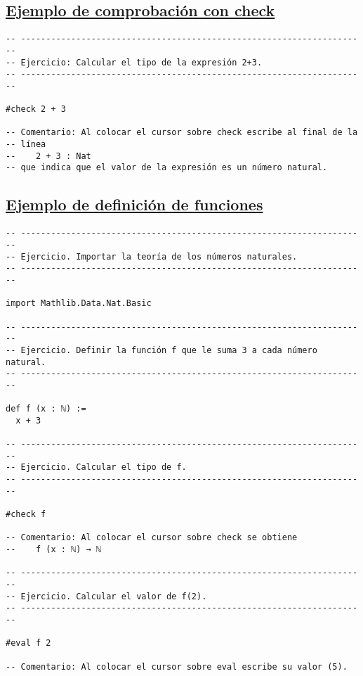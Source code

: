 \subsection{\href{./src/Introduccion/Ejemplo\_de\_comprobacion\_con\_check.lean}{Ejemplo de comprobación con check}}
\label{sec:orgaa2cc60}
\begin{verbatim}
-- ---------------------------------------------------------------------
-- Ejercicio: Calcular el tipo de la expresión 2+3.
-- ---------------------------------------------------------------------

#check 2 + 3

-- Comentario: Al colocar el cursor sobre check escribe al final de la
-- línea
--    2 + 3 : Nat
-- que indica que el valor de la expresión es un número natural.
\end{verbatim}

\subsection{\href{./src/Introduccion/Ejemplo\_de\_definicion\_de\_funciones.lean}{Ejemplo de definición de funciones}}
\label{sec:org624f9ab}
\begin{verbatim}
-- ---------------------------------------------------------------------
-- Ejercicio. Importar la teoría de los números naturales.
-- ---------------------------------------------------------------------

import Mathlib.Data.Nat.Basic

-- ---------------------------------------------------------------------
-- Ejercicio. Definir la función f que le suma 3 a cada número natural.
-- ---------------------------------------------------------------------

def f (x : ℕ) :=
  x + 3

-- ---------------------------------------------------------------------
-- Ejercicio. Calcular el tipo de f.
-- ---------------------------------------------------------------------

#check f

-- Comentario: Al colocar el cursor sobre check se obtiene
--    f (x : ℕ) → ℕ

-- ---------------------------------------------------------------------
-- Ejercicio. Calcular el valor de f(2).
-- ---------------------------------------------------------------------

#eval f 2

-- Comentario: Al colocar el cursor sobre eval escribe su valor (5).
\end{verbatim}

